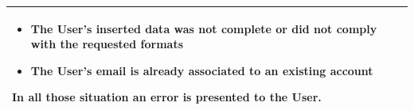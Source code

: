\documentclass[11pt]{article}
\begin{document}
\begin{description}
\begin{table}[H]
\begin{tabularx}{\textwidth}{|>{\hsize=0.5\hsize}X|>{\hsize=1.5\hsize}X|}
\begin{minipage}[t]{\hsize}
\begin{itemize}[topsep=0pt, leftmargin=*]
                    \item The User's inserted data was not complete or did not comply with the requested formats
                    \item The User's email is already associated to an existing account
                \end{itemize}
                \vspace{8pt}
                \end{minipage}
                In all those situation an error is presented to the User.
                \vspace{6pt}
            \\
            \hline
        \end{tabularx}
    \end{table}
    

\end{description}
\end{document}
